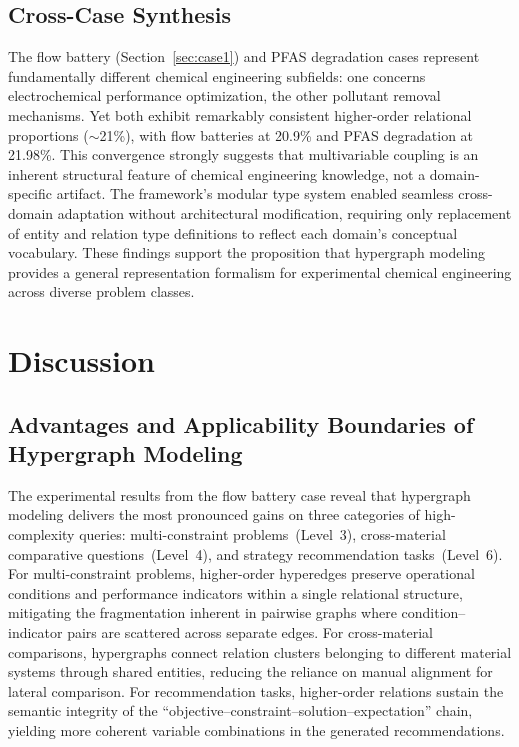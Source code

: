 \documentclass[11pt,a4paper]{article}
\begin{document}
\subsection{Cross-Case Synthesis}

The flow battery (Section~\ref{sec:case1}) and PFAS degradation cases represent fundamentally different chemical engineering subfields: one concerns electrochemical performance optimization, the other pollutant removal mechanisms. Yet both exhibit remarkably consistent higher-order relational proportions ($\sim$21\%), with flow batteries at 20.9\% and PFAS degradation at 21.98\%. This convergence strongly suggests that multivariable coupling is an inherent structural feature of chemical engineering knowledge, not a domain-specific artifact. The framework's modular type system enabled seamless cross-domain adaptation without architectural modification, requiring only replacement of entity and relation type definitions to reflect each domain's conceptual vocabulary. These findings support the proposition that hypergraph modeling provides a general representation formalism for experimental chemical engineering across diverse problem classes.


\section{Discussion}
\label{sec:discussion}

\subsection{Advantages and Applicability Boundaries of Hypergraph Modeling}

The experimental results from the flow battery case reveal that hypergraph modeling delivers the most pronounced gains on three categories of high-complexity queries: multi-constraint problems~(Level~3), cross-material comparative questions~(Level~4), and strategy recommendation tasks~(Level~6). For multi-constraint problems, higher-order hyperedges preserve operational conditions and performance indicators within a single relational structure, mitigating the fragmentation inherent in pairwise graphs where condition--indicator pairs are scattered across separate edges. For cross-material comparisons, hypergraphs connect relation clusters belonging to different material systems through shared entities, reducing the reliance on manual alignment for lateral comparison. For recommendation tasks, higher-order relations sustain the semantic integrity of the ``objective--constraint--solution--expectation'' chain, yielding more coherent variable combinations in the generated recommendations.
\end{document}
